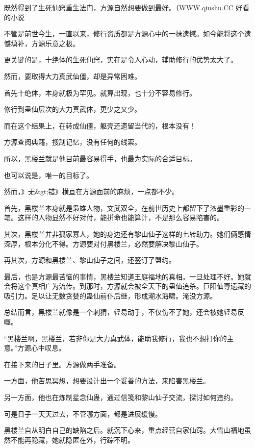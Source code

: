 
\begin{this_body}

既然得到了生死仙窍重生法门，方源自然想要做到最好。（WWW.qiushu.CC 好看的小说

不管是前世今生，一直以来，修行资质都是方源心中的一抹遗憾。如今能将这个遗憾填补，方源乐意之极。

更关键的是，十绝体的生死仙窍，实在是令人心动，辅助修行的优势太大了。

然而，要取得大力真武仙僵，却是异常困难。

首先十绝体，本身就极为罕见。就算出现，也十分不容易修行。

修行到蛊仙层次的大力真武体，更少之又少。

而在这个结果上，在转成仙僵，躯壳还遗留当代的，根本没有！

方源查阅典籍，搜刮记忆，没有任何的线索。

所以，黑楼兰就是他目前最容易得手，也最为实际的合适目标。

也可以说是，唯一的目标了。

然而，》无\&gt;错》横亘在方源面前的麻烦，一点都不少。

首先，黑楼兰本身就是枭雄人物，文武双全，在前世历史上都留下了浓墨重彩的一笔。这样的人物显然不好对付，能拼命也能算计，不是那么容易陷害的。

其次，黑楼兰并非孤家寡人，她的身边还有黎山仙子这样的七转助力。她们俩感情深厚，根本分化不得。方源要对付黑楼兰，必然要解决黎山仙子。

再其次，方源和黑楼兰、黎山仙子之间，还签订了盟约。

最后，也是方源最苦恼的事情，黑楼兰知道王庭福地的真相。一旦处理不好。她就会将这个真相广为流传。到那时，方源就会被全天下的蛊仙追杀。巨阳仙尊遗藏的吸引力。足以让无数贪婪的蛊仙前仆后继，形成潮水海啸。淹没方源。

总结而言，黑楼兰就像是一个刺猬，轻易动手，不仅伤不了她，还会被她轻易反噬。

“黑楼兰啊，黑楼兰，若非你是大力真武体，能助我修行，我也不想打你的主意。”方源心中叹息。

在接下来的日子里。方源做两手准备。

一方面，他苦思冥想，想要设计出一个妥善的方法，来陷害黑楼兰。

另一方面，他也在炼制星念仙蛊，通过信笺和黎山仙子交流，探讨如何违约。

可是日子一天天过去，不管哪方面，都是进展缓慢。

黑楼兰自从明白自己的缺陷之后。就沉下心来，重点经营自家仙窍。大雪山福地虽然不能再隐藏，她就隐匿在外，行踪不明。


\end{this_body}
